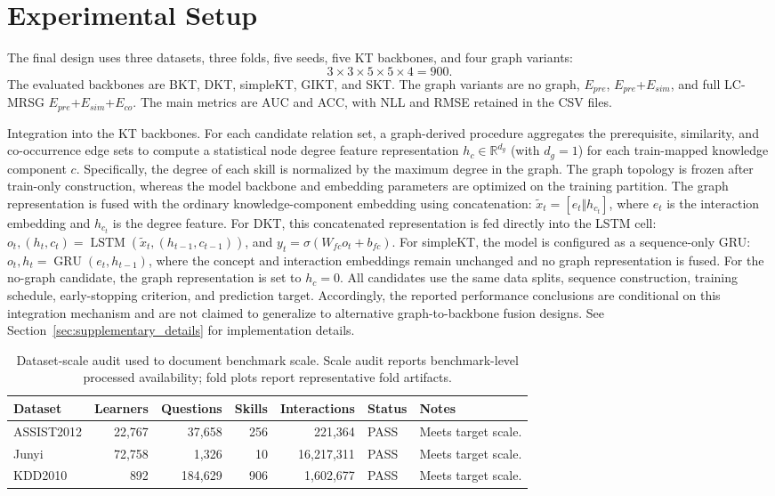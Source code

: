 \documentclass[11pt,a4paper]{article}
\newcommand{\Epre}{$E_{pre}$}
\newcommand{\Esim}{$E_{sim}$}
\newcommand{\Eco}{$E_{co}$}
\newcommand{\LCMRSG}{LC-MRSG}
\begin{document}
\section{Experimental Setup}
The final design uses three datasets, three folds, five seeds, five KT backbones, and four graph variants:
\begin{equation}
3\times 3\times 5\times 5\times 4 = 900.
\end{equation}
The evaluated backbones are BKT, DKT, simpleKT, GIKT, and SKT. The graph variants are no graph, \Epre{}, \Epre{}+\Esim{}, and full \LCMRSG{} \Epre{}+\Esim{}+\Eco{}. The main metrics are AUC and ACC, with NLL and RMSE retained in the CSV files.

Integration into the KT backbones. For each candidate relation set, a graph-derived procedure aggregates the prerequisite, similarity, and co-occurrence edge sets to compute a statistical node degree feature representation $h_c \in \mathbb{R}^{d_g}$ (with $d_g = 1$) for each train-mapped knowledge component $c$. Specifically, the degree of each skill is normalized by the maximum degree in the graph. The graph topology is frozen after train-only construction, whereas the model backbone and embedding parameters are optimized on the training partition. The graph representation is fused with the ordinary knowledge-component embedding using concatenation: $\widetilde x_t = [e_t \Vert h_{c_t}]$, where $e_t$ is the interaction embedding and $h_{c_t}$ is the degree feature. For DKT, this concatenated representation is fed directly into the LSTM cell: $o_t, (h_t, c_t) = \operatorname{LSTM}(\widetilde x_t, (h_{t-1}, c_{t-1}))$, and $y_t = \sigma(W_{fc} o_t + b_{fc})$. For simpleKT, the model is configured as a sequence-only GRU: $o_t, h_t = \operatorname{GRU}(e_t, h_{t-1})$, where the concept and interaction embeddings remain unchanged and no graph representation is fused. For the no-graph candidate, the graph representation is set to $h_c = 0$. All candidates use the same data splits, sequence construction, training schedule, early-stopping criterion, and prediction target. Accordingly, the reported performance conclusions are conditional on this integration mechanism and are not claimed to generalize to alternative graph-to-backbone fusion designs. See Section~\ref{sec:supplementary_details} for implementation details.

\begin{table}[H]
\centering
\caption{Dataset-scale audit used to document benchmark scale. Scale audit reports benchmark-level processed availability; fold plots report representative fold artifacts.}
\label{tab:dataset-scale}
\begin{tabular}{lrrrrll}
\toprule
Dataset & Learners & Questions & Skills & Interactions & Status & Notes \\
\midrule
ASSIST2012 & 22,767 & 37,658 & 256 & 221,364 & PASS & Meets target scale. \\
Junyi & 72,758 & 1,326 & 10 & 16,217,311 & PASS & Meets target scale. \\
KDD2010 & 892 & 184,629 & 906 & 1,602,677 & PASS & Meets target scale. \\
\bottomrule
\end{tabular}
\end{table}
\end{document}
